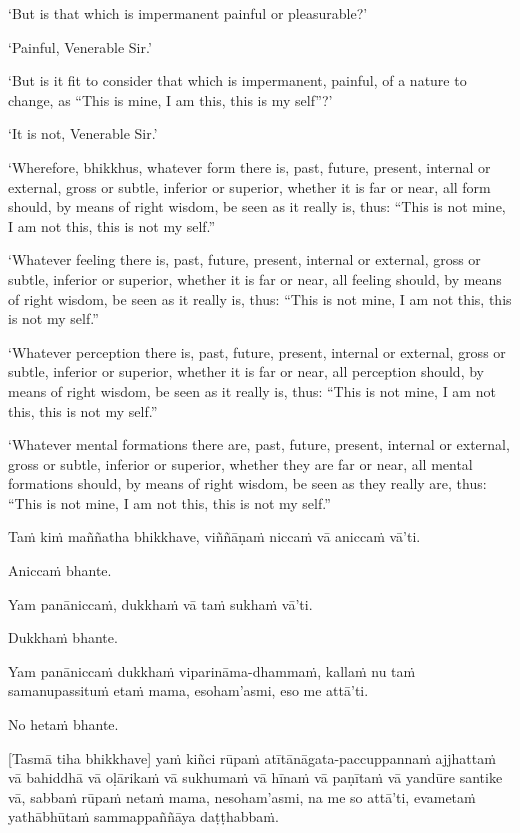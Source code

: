 ‘But is that which is impermanent painful or pleasurable?’

‘Painful, Venerable Sir.’

‘But is it fit to consider that which is impermanent, painful, of a
nature to change, as “This is mine, I am this, this is my self”?’

‘It is not, Venerable Sir.’

‘Wherefore, bhikkhus, whatever form there is, past, future, present,
internal or external, gross or subtle, inferior or superior, whether it
is far or near, all form should, by means of right wisdom, be seen as it
really is, thus: “This is not mine, I am not this, this is not my self.”

‘Whatever feeling there is, past, future, present, internal or
external, gross or subtle, inferior or superior, whether it is far or
near, all feeling should, by means of right wisdom, be seen as it really
is, thus: “This is not mine, I am not this, this is not my self.”

‘Whatever perception there is, past, future, present, internal or
external, gross or subtle, inferior or superior, whether it is far or
near, all perception should, by means of right wisdom, be seen as it really
is, thus: “This is not mine, I am not this, this is not my self.”

‘Whatever mental formations there are, past, future, present, internal
or external, gross or subtle, inferior or superior, whether they are far
or near, all mental formations should, by means of right wisdom, be seen
as they really are, thus: “This is not mine, I am not this, this is not
my self.”

\clearpage

\paliText
\markboth{\paliTitle}{\rightmark}

Taṁ kiṁ maññatha bhikkhave, viññāṇaṁ niccaṁ vā aniccaṁ vā'ti.

Aniccaṁ bhante.

Yam panāniccaṁ, dukkhaṁ vā taṁ sukhaṁ vā'ti.

Dukkhaṁ bhante.

Yam panāniccaṁ dukkhaṁ viparināma-dhammaṁ, kallaṁ nu taṁ samanupassituṁ
etaṁ mama, esoham'asmi, eso me attā'ti.

No hetaṁ bhante.

[Tasmā tiha bhikkhave] yaṁ kiñci rūpaṁ atītānāgata-paccuppannaṁ ajjhattaṁ
vā bahiddhā vā oḷārikaṁ vā sukhumaṁ vā hīnaṁ vā paṇītaṁ vā yandūre
santike vā, sabbaṁ rūpaṁ netaṁ mama, nesoham'asmi, na me so attā'ti,
evametaṁ yathābhūtaṁ sammappaññāya daṭṭhabbaṁ.

